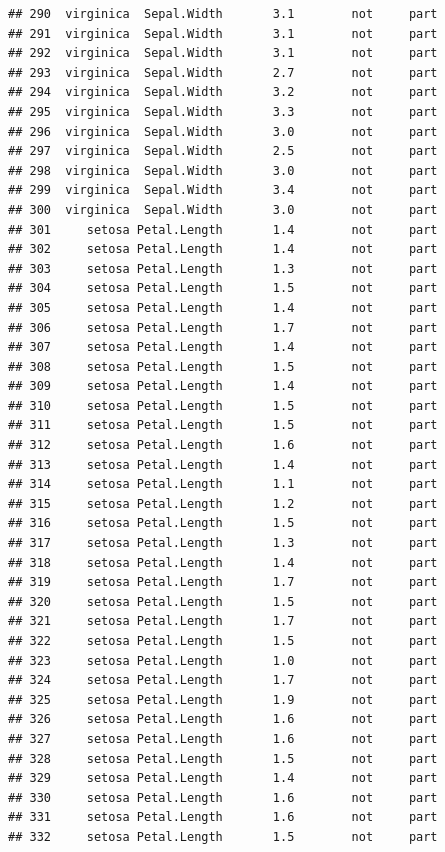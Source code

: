 \documentclass[krantz2]{krantz}\usepackage{knitr}%
\begin{document}
\begin{knitrout}
\begin{kframe}
\begin{verbatim}
## 290  virginica  Sepal.Width       3.1        not     part
## 291  virginica  Sepal.Width       3.1        not     part
## 292  virginica  Sepal.Width       3.1        not     part
## 293  virginica  Sepal.Width       2.7        not     part
## 294  virginica  Sepal.Width       3.2        not     part
## 295  virginica  Sepal.Width       3.3        not     part
## 296  virginica  Sepal.Width       3.0        not     part
## 297  virginica  Sepal.Width       2.5        not     part
## 298  virginica  Sepal.Width       3.0        not     part
## 299  virginica  Sepal.Width       3.4        not     part
## 300  virginica  Sepal.Width       3.0        not     part
## 301     setosa Petal.Length       1.4        not     part
## 302     setosa Petal.Length       1.4        not     part
## 303     setosa Petal.Length       1.3        not     part
## 304     setosa Petal.Length       1.5        not     part
## 305     setosa Petal.Length       1.4        not     part
## 306     setosa Petal.Length       1.7        not     part
## 307     setosa Petal.Length       1.4        not     part
## 308     setosa Petal.Length       1.5        not     part
## 309     setosa Petal.Length       1.4        not     part
## 310     setosa Petal.Length       1.5        not     part
## 311     setosa Petal.Length       1.5        not     part
## 312     setosa Petal.Length       1.6        not     part
## 313     setosa Petal.Length       1.4        not     part
## 314     setosa Petal.Length       1.1        not     part
## 315     setosa Petal.Length       1.2        not     part
## 316     setosa Petal.Length       1.5        not     part
## 317     setosa Petal.Length       1.3        not     part
## 318     setosa Petal.Length       1.4        not     part
## 319     setosa Petal.Length       1.7        not     part
## 320     setosa Petal.Length       1.5        not     part
## 321     setosa Petal.Length       1.7        not     part
## 322     setosa Petal.Length       1.5        not     part
## 323     setosa Petal.Length       1.0        not     part
## 324     setosa Petal.Length       1.7        not     part
## 325     setosa Petal.Length       1.9        not     part
## 326     setosa Petal.Length       1.6        not     part
## 327     setosa Petal.Length       1.6        not     part
## 328     setosa Petal.Length       1.5        not     part
## 329     setosa Petal.Length       1.4        not     part
## 330     setosa Petal.Length       1.6        not     part
## 331     setosa Petal.Length       1.6        not     part
## 332     setosa Petal.Length       1.5        not     part

\end{verbatim}
\end{kframe}
\end{knitrout}
\end{document}

